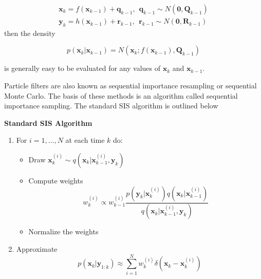 \begin{eqnarray}
\mathbf{x}_k = f(\mathbf{x}_{k-1}) + \mathbf{q}_{k-1}, ~~ \mathbf{q}_{k-1} \sim N(\mathbf{0}, \mathbf{Q}_{k-1}) \\
\mathbf{y}_k = h(\mathbf{x}_{k-1}) + \mathbf{r}_{k-1}, ~~ \mathbf{r}_{k-1} \sim N(\mathbf{0}, \mathbf{R}_{k-1}) 
\end{eqnarray}
then the density 

\begin{equation}
p(\mathbf{x}_k | \mathbf{x}_{k-1}) = N(\mathbf{x}_k; f(\mathbf{x}_{k-1}), \mathbf{Q}_{k-1})
\end{equation}

is generally easy to be evaluated for any values of $ \mathbf{x}_k$ and $\mathbf{x}_{k-1}$.

Particle filters are also known as sequential importance resampling or sequential Monte Carlo.
The basis of these methods is an algorithm called  sequential importance sampling. The standard SIS algorithm
is outlined below 


\begin{framed}
\theoremstyle{remark}
\begin{remark}{\textbf{Standard SIS Algorithm}}

\begin{enumerate}
\item For $i=1,\ldots, N$ at each time $k$ do:
	\begin{itemize}
		\item Draw $\mathbf{x}_{k}^{(i)} \sim q(\mathbf{x}_k | \mathbf{x}_{k-1}^{(i)}, \mathbf{y}_k)$
		\item Compute weights
			\begin{equation}
				w_{k}^{(i)} \propto w_{k-1}^{(i)} \frac{p(\mathbf{y}_k | \mathbf{x}_{k}^{(i)})q(\mathbf{x}_k | \mathbf{x}_{k-1}^{(i)})}{q(\mathbf{x}_k | \mathbf{x}_{k-1}^{(i)}, \mathbf{y}_k)}
			\end{equation}
		\item Normalize the weights
	\end{itemize}
\item Approximate
\begin{equation}
p(\mathbf{x}_k | \mathbf{y}_{1:k}) \approx \sum_{i=1}^{N} w_{k}^{(i)} \delta(\mathbf{x}_k - \mathbf{x}_{k}^{(i)})
\end{equation}
\end{enumerate}

\end{remark}
\end{framed}

